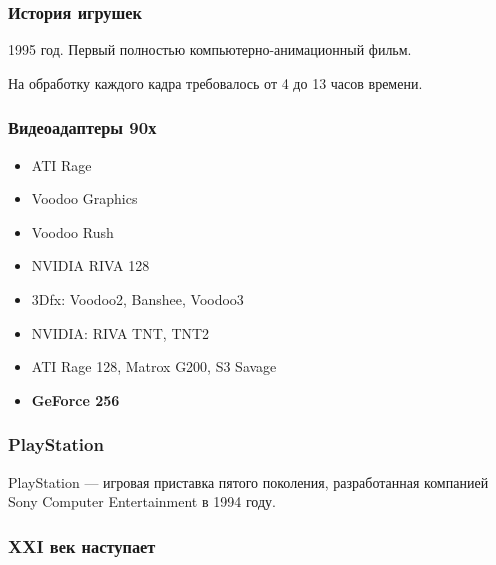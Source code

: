 \documentclass[10pt]{beamer}
\begin{document}
\begin{frame}\frametitle{История игрушек}
{
		{
		}
		{
			1995 год. Первый полностью компьютерно-анимационный фильм.
			
			На обработку каждого кадра требовалось от 4 до 13 часов времени.
			
			\hfill
			
		} 
}\end{frame}

\begin{frame}\frametitle{Видеоадаптеры 90х}
{
	{
			\begin{itemize}
			
			\item ATI Rage
			\item Voodoo Graphics
			\item Voodoo Rush
			\item NVIDIA RIVA 128
			\item 3Dfx: Voodoo2, Banshee, Voodoo3
			\item NVIDIA: RIVA TNT, TNT2
			\item ATI Rage 128, Matrox G200, S3 Savage
			\item \textbf{GeForce 256}
			
		\end{itemize}
	}
	{
	}

}\end{frame}

\begin{frame}\frametitle{PlayStation}
{
	{
	}
	{
		PlayStation --- игровая приставка пятого поколения, разработанная компанией Sony Computer Entertainment в 1994 году.
		
		\hfill
				
		
	}
	
	\footnotesize {}
}\end{frame}


\begin{frame}\frametitle{
	XXI век наступает
}
{
	\footnotesize {}
}\end{frame}
\end{document}
